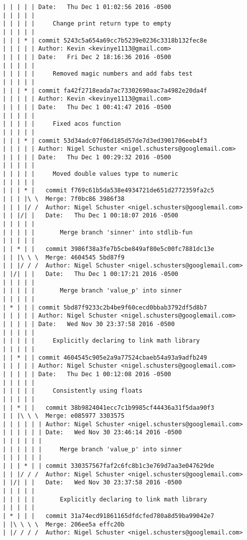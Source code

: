 \begin{lstlisting}
| | | | | Date:   Thu Dec 1 01:02:56 2016 -0500
| | | | | 
| | | | |     Change print return type to empty
| | | | |      
| | | * | commit 5243c5a654a69cc7b5239e0236c3318b132fec8e
| | | | | Author: Kevin <kevinye1113@gmail.com>
| | | | | Date:   Fri Dec 2 18:16:36 2016 -0500
| | | | | 
| | | | |     Removed magic numbers and add fabs test
| | | | |      
| | | * | commit fa42f2718eada7ac73302690aac7a4982e20da4f
| | | | | Author: Kevin <kevinye1113@gmail.com>
| | | | | Date:   Thu Dec 1 00:41:47 2016 -0500
| | | | | 
| | | | |     Fixed acos function
| | | | |      
| | | * | commit 53d34adc07f06d185d57de7d3ed3901706eeb4f3
| | | | | Author: Nigel Schuster <nigel.schusters@googlemail.com>
| | | | | Date:   Thu Dec 1 00:29:32 2016 -0500
| | | | | 
| | | | |     Moved double values type to numeric
| | | | |        
| | | * |   commit f769c61b5da538e4934721de651d2772359fa2c5
| | | |\ \  Merge: 7f0bc86 3986f38
| | | |/ /  Author: Nigel Schuster <nigel.schusters@googlemail.com>
| | |/| |   Date:   Thu Dec 1 00:18:07 2016 -0500
| | | | |   
| | | | |       Merge branch 'sinner' into stdlib-fun
| | | | |        
| | * | |   commit 3986f38a3fe7b5cbe849af80e5c00fc7881dc13e
| | |\ \ \  Merge: 4604545 5bd87f9
| | |/ / /  Author: Nigel Schuster <nigel.schusters@googlemail.com>
| |/| | |   Date:   Thu Dec 1 00:17:21 2016 -0500
| | | | |   
| | | | |       Merge branch 'value_p' into sinner
| | | | |      
| * | | | commit 5bd87f9233c2b4be9f60cecd0bbab3792df5d8b7
| | | | | Author: Nigel Schuster <nigel.schusters@googlemail.com>
| | | | | Date:   Wed Nov 30 23:37:58 2016 -0500
| | | | | 
| | | | |     Explicitly declaring to link math library
| | | | |      
| | * | | commit 4604545c905e2a9a77524cbaeb54a93a9adfb249
| | | | | Author: Nigel Schuster <nigel.schusters@googlemail.com>
| | | | | Date:   Thu Dec 1 00:12:08 2016 -0500
| | | | | 
| | | | |     Consistently using floats
| | | | |        
| | * | |   commit 38b9824041ecc7c1b9985cf44436a31f5daa90f3
| | |\ \ \  Merge: e085977 3303575
| | | | | | Author: Nigel Schuster <nigel.schusters@googlemail.com>
| | | | | | Date:   Wed Nov 30 23:46:14 2016 -0500
| | | | | | 
| | | | | |     Merge branch 'value_p' into sinner
| | | | | |       
| | | * | | commit 330357567faf2c6fc8b1c3e769d7aa3e047629de
| | |/ / /  Author: Nigel Schuster <nigel.schusters@googlemail.com>
| |/| | |   Date:   Wed Nov 30 23:37:58 2016 -0500
| | | | |   
| | | | |       Explicitly declaring to link math library
| | | | |        
| * | | |   commit 31a74ecd91861165dfdcfed780a8d59ba99042e7
| |\ \ \ \  Merge: 206ee5a effc20b
| |/ / / /  Author: Nigel Schuster <nigel.schusters@googlemail.com>

\end{lstlisting}
